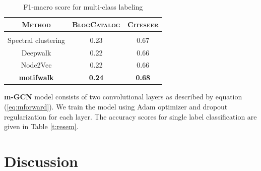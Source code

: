 \documentclass{article}
\theoremstyle{definition}
\begin{document}
\begin{table}
\centering
\begin{tabular}{c | c c}
\textbf{\textsc{Method}} & \textsc{BlogCatalog} & \textsc{Citeseer} \\
\hline \\
Spectral clustering & 0.23 & 0.67\\
Deepwalk & 0.22 & 0.66\\
Node2Vec & 0.22 & 0.66\\
\textbf{motifwalk} & \textbf{0.24} & \textbf{0.68}\\
\end{tabular}%
\caption{F1-macro score for multi-class labeling}
\label{t:re}
\end{table}

\textbf{m-GCN} model consists of two convolutional layers as described by
equation (\ref{eq:mforward}). We train the model using Adam \cite{adam} optimizer
and dropout regularization for each layer. The accuracy scores for single label
classification are given in Table \ref{t:resem}.  

\begin{table}
\centering
{}
\setlength{\belowcaptionskip}{-10pt}
\caption{Accuracy score for multi-class labeling}
\label{t:resem}
\end{table}

\section{Discussion}
\end{document}
